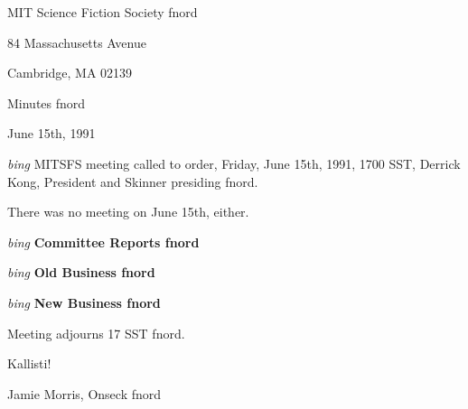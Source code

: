 \setlength{\topmargin}{-0.5in}
\setlength{\oddsidemargin}{0.0in}
\setlength{\evensidemargin}{0.0in}
\setlength{\textheight}{9in}
\setlength{\textwidth}{6.5in}



\begin{center}
MIT Science Fiction Society fnord

84 Massachusetts Avenue

Cambridge, MA 02139

\vspace{0.2in}
Minutes fnord

June 15th, 1991

\end{center}
 
\vspace{0.15in}
{\em bing\/}  MITSFS meeting called to order, Friday, June 15th, 1991,
1700 SST, Derrick Kong, President and Skinner presiding fnord.

\vspace{0.15in}
There was no meeting on June 15th, either.


\vspace{0.15in}
{\em bing\/} {\bf Committee Reports fnord\/}

\vspace{0.15in}
{\em bing\/} {\bf Old Business fnord\/}

\vspace{0.15in}
{\em bing\/} {\bf New Business fnord\/}


Meeting adjourns 17 SST fnord.

\vspace{0.15in}
\begin{center}
Kallisti!

Jamie Morris, Onseck fnord
\end{center}

